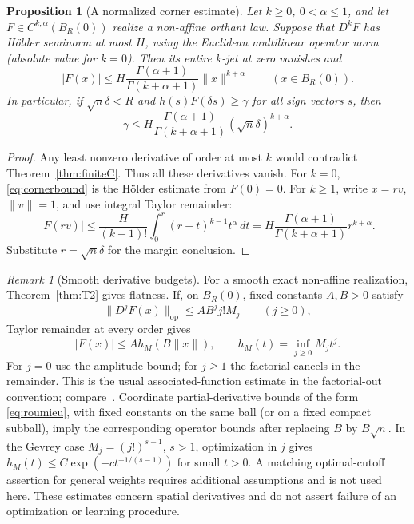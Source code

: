 \documentclass[11pt]{article}
\newtheorem{proposition}[theorem]{Proposition}
\theoremstyle{definition}
\theoremstyle{remark}
\newtheorem{remark}[theorem]{Remark}
\begin{document}
\begin{proposition}[A normalized corner estimate]\label{prop:corner}
Let $k\ge0$, $0<\alpha\le1$, and let $F\in C^{k,\alpha}(B_R(0))$ realize a non-affine orthant law. Suppose that $D^kF$ has H\"older seminorm at most $H$, using the Euclidean multilinear operator norm (absolute value for $k=0$). Then its entire $k$-jet at zero vanishes and
\begin{equation}\label{eq:cornerbound}
 |F(x)|\le H\frac{\Gamma(\alpha+1)}{\Gamma(k+\alpha+1)}\|x\|^{k+\alpha}
 \qquad(x\in B_R(0)).
\end{equation}
In particular, if $\sqrt n\delta<R$ and $h(s)F(\delta s)\ge\gamma$ for all sign vectors $s$, then
\[
 \gamma\le H\frac{\Gamma(\alpha+1)}{\Gamma(k+\alpha+1)}(\sqrt n\delta)^{k+\alpha}.
\]
\end{proposition}

\begin{proof}
Any least nonzero derivative of order at most $k$ would contradict Theorem~\ref{thm:finiteC}. Thus all these derivatives vanish. For $k=0$, \eqref{eq:cornerbound} is the H\"older estimate from $F(0)=0$. For $k\ge1$, write $x=rv$, $\|v\|=1$, and use integral Taylor remainder:
\[
 |F(rv)|\le\frac{H}{(k-1)!}\int_0^r(r-t)^{k-1}t^\alpha\,dt
 =H\frac{\Gamma(\alpha+1)}{\Gamma(k+\alpha+1)}r^{k+\alpha}.
\]
Substitute $r=\sqrt n\delta$ for the margin conclusion.
\end{proof}

\begin{remark}[Smooth derivative budgets]\label{rem:associated}
For a smooth exact non-affine realization, Theorem~\ref{thm:T2} gives flatness. If, on $B_R(0)$, fixed constants $A,B>0$ satisfy
\[
 \|D^jF(x)\|_{\mathrm{op}}\le A B^j j!M_j\qquad(j\ge0),
\]
Taylor remainder at every order gives
\begin{equation}\label{eq:associatedbound}
 |F(x)|\le A h_M(B\|x\|),\qquad h_M(t)=\inf_{j\ge0}M_jt^j.
\end{equation}
For $j=0$ use the amplitude bound; for $j\ge1$ the factorial cancels in the remainder. This is the usual associated-function estimate in the factorial-out convention; compare~\cite[Section~7]{Rainer2022}. Coordinate partial-derivative bounds of the form \eqref{eq:roumieu}, with fixed constants on the same ball (or on a fixed compact subball), imply the corresponding operator bounds after replacing $B$ by $B\sqrt n$. In the Gevrey case $M_j=(j!)^{s-1}$, $s>1$, optimization in $j$ gives $h_M(t)\le C\exp(-c t^{-1/(s-1)})$ for small $t>0$. A matching optimal-cutoff assertion for general weights requires additional assumptions and is not used here. These estimates concern spatial derivatives and do not assert failure of an optimization or learning procedure.
\end{remark}
\end{document}
